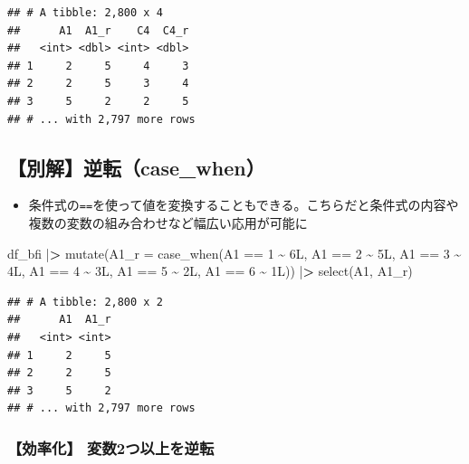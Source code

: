 \documentclass[
  xelatex,ja=standard, b5paper]{bxjsbook}
\newenvironment{Shaded}{\begin{snugshade}}{\end{snugshade}}
\newcommand{\AttributeTok}[1]{\textcolor[rgb]{0.77,0.63,0.00}{#1}}
\newcommand{\DecValTok}[1]{\textcolor[rgb]{0.00,0.00,0.81}{#1}}
\newcommand{\ErrorTok}[1]{\textcolor[rgb]{0.64,0.00,0.00}{\textbf{#1}}}
\newcommand{\FunctionTok}[1]{\textcolor[rgb]{0.00,0.00,0.00}{#1}}
\newcommand{\NormalTok}[1]{#1}
\newcommand{\SpecialCharTok}[1]{\textcolor[rgb]{0.00,0.00,0.00}{#1}}
\providecommand{\tightlist}{%
  \setlength{\itemsep}{0pt}\setlength{\parskip}{0pt}}
\begin{document}
\begin{verbatim}
## # A tibble: 2,800 x 4
##      A1  A1_r    C4  C4_r
##   <int> <dbl> <int> <dbl>
## 1     2     5     4     3
## 2     2     5     3     4
## 3     5     2     2     5
## # ... with 2,797 more rows
\end{verbatim}

\hypertarget{mu-rev-casewhen1}{%
\subsection{【別解】逆転（case\_when）}\label{mu-rev-casewhen1}}

\begin{itemize}
\tightlist
\item
  条件式の\texttt{==}を使って値を変換することもできる。こちらだと条件式の内容や複数の変数の組み合わせなど幅広い応用が可能に
\end{itemize}

\begin{Shaded}
\begin{Highlighting}[]
\NormalTok{df\_bfi }\SpecialCharTok{|}\ErrorTok{\textgreater{}} 
  \FunctionTok{mutate}\NormalTok{(}\AttributeTok{A1\_r =} \FunctionTok{case\_when}\NormalTok{(A1 }\SpecialCharTok{==} \DecValTok{1} \SpecialCharTok{\textasciitilde{}}\NormalTok{ 6L,}
\NormalTok{                          A1 }\SpecialCharTok{==} \DecValTok{2} \SpecialCharTok{\textasciitilde{}}\NormalTok{ 5L,}
\NormalTok{                          A1 }\SpecialCharTok{==} \DecValTok{3} \SpecialCharTok{\textasciitilde{}}\NormalTok{ 4L,}
\NormalTok{                          A1 }\SpecialCharTok{==} \DecValTok{4} \SpecialCharTok{\textasciitilde{}}\NormalTok{ 3L,}
\NormalTok{                          A1 }\SpecialCharTok{==} \DecValTok{5} \SpecialCharTok{\textasciitilde{}}\NormalTok{ 2L,}
\NormalTok{                          A1 }\SpecialCharTok{==} \DecValTok{6} \SpecialCharTok{\textasciitilde{}}\NormalTok{ 1L)) }\SpecialCharTok{|}\ErrorTok{\textgreater{}} 
  \FunctionTok{select}\NormalTok{(A1, A1\_r)}
\end{Highlighting}
\end{Shaded}

\begin{verbatim}
## # A tibble: 2,800 x 2
##      A1  A1_r
##   <int> <int>
## 1     2     5
## 2     2     5
## 3     5     2
## # ... with 2,797 more rows
\end{verbatim}

\hypertarget{mu-rev-casewhen2}{%
\subsubsection{【効率化】 変数2つ以上を逆転}\label{mu-rev-casewhen2}}
\end{document}
